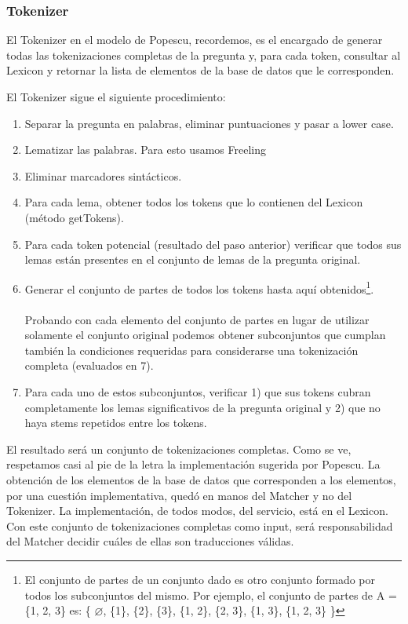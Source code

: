 \subsubsection*{Tokenizer}
\label{subsubsec:tokenizer}

El Tokenizer en el modelo de Popescu, recordemos, es el encargado de generar todas las tokenizaciones completas de la pregunta y, para cada token, consultar al Lexicon y retornar la lista de elementos de la base de datos que le corresponden.

\medskip

El Tokenizer sigue el siguiente procedimiento:
\begin{enumerate}
\item Separar la pregunta en palabras, eliminar puntuaciones y pasar a lower case.
\item Lematizar las palabras. Para esto usamos Freeling
\item Eliminar marcadores sintácticos.
\item Para cada lema, obtener todos los tokens que lo contienen del Lexicon (método getTokens).
\item Para cada token potencial (resultado del paso anterior) verificar que todos sus lemas están presentes en el conjunto de lemas de la pregunta original.
\item Generar el conjunto de partes de todos los tokens hasta aquí obtenidos\footnote{El conjunto de partes de un conjunto dado es otro conjunto formado por todos los subconjuntos del mismo. Por ejemplo, el conjunto de partes de A = \{1, 2, 3\} es: \{ $\varnothing$, \{1\}, \{2\}, \{3\}, \{1, 2\}, \{2, 3\}, \{1, 3\}, \{1, 2, 3\} \}}. \\ \\
	Probando con cada elemento del conjunto de partes en lugar de utilizar solamente el conjunto original podemos obtener subconjuntos que cumplan también la condiciones requeridas para considerarse una tokenización completa (evaluados en 7).
\item Para cada uno de estos subconjuntos, verificar 1) que sus tokens cubran completamente los lemas significativos de la pregunta original y 2) que no haya stems repetidos entre los tokens.
\end{enumerate}

El resultado será un conjunto de tokenizaciones completas. Como se ve, respetamos casi al pie de la letra la implementación sugerida por Popescu. La obtención de los elementos de la base de datos que corresponden a los elementos, por una cuestión implementativa, quedó en manos del Matcher y no del Tokenizer. La implementación, de todos modos, del servicio, está en el Lexicon. Con este conjunto de tokenizaciones completas como input, será responsabilidad del Matcher decidir cuáles de ellas son traducciones válidas.

